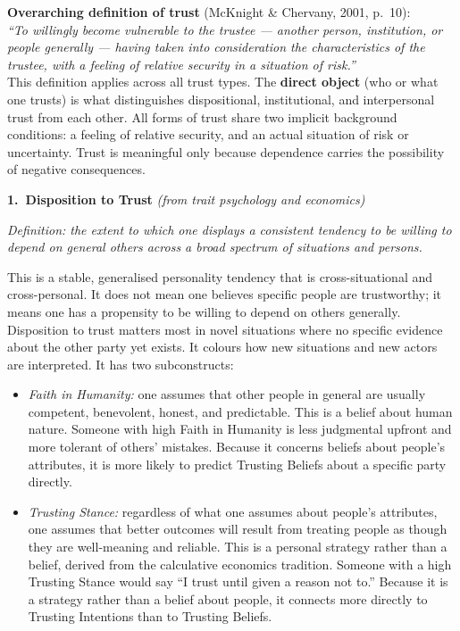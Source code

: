 \documentclass[11pt, a4paper]{article}
\begin{document}
\begin{tcolorbox}[colback=refgray, colframe=black!25, boxrule=0.5pt, sharp corners, left=8pt, right=8pt, top=6pt, bottom=6pt]
\textbf{Overarching definition of trust} (McKnight \& Chervany, 2001, p.~10):\\[4pt]
\textit{``To willingly become vulnerable to the trustee --- another person, institution, or people generally --- having taken into consideration the characteristics of the trustee, with a feeling of relative security in a situation of risk.''}\\[4pt]
This definition applies across all trust types. The \textbf{direct object} (who or what one trusts) is what distinguishes dispositional, institutional, and interpersonal trust from each other. All forms of trust share two implicit background conditions: a feeling of relative security, and an actual situation of risk or uncertainty. Trust is meaningful only because dependence carries the possibility of negative consequences.
\end{tcolorbox}

\bigskip
\noindent\textbf{1.\ Disposition to Trust} \hfill \textit{(from trait psychology and economics)}

\textit{Definition: the extent to which one displays a consistent tendency to be willing to depend on general others across a broad spectrum of situations and persons.}

This is a stable, generalised personality tendency that is cross-situational and cross-personal. It does not mean one believes specific people are trustworthy; it means one has a propensity to be willing to depend on others generally. Disposition to trust matters most in novel situations where no specific evidence about the other party yet exists. It colours how new situations and new actors are interpreted. It has two subconstructs:

\begin{itemize}[leftmargin=2em]
  \item \textit{Faith in Humanity:} one assumes that other people in general are usually competent, benevolent, honest, and predictable. This is a belief about human nature. Someone with high Faith in Humanity is less judgmental upfront and more tolerant of others' mistakes. Because it concerns beliefs about people's attributes, it is more likely to predict Trusting Beliefs about a specific party directly.
  \item \textit{Trusting Stance:} regardless of what one assumes about people's attributes, one assumes that better outcomes will result from treating people as though they are well-meaning and reliable. This is a personal strategy rather than a belief, derived from the calculative economics tradition. Someone with a high Trusting Stance would say ``I trust until given a reason not to.'' Because it is a strategy rather than a belief about people, it connects more directly to Trusting Intentions than to Trusting Beliefs.
\end{itemize}
\end{document}
